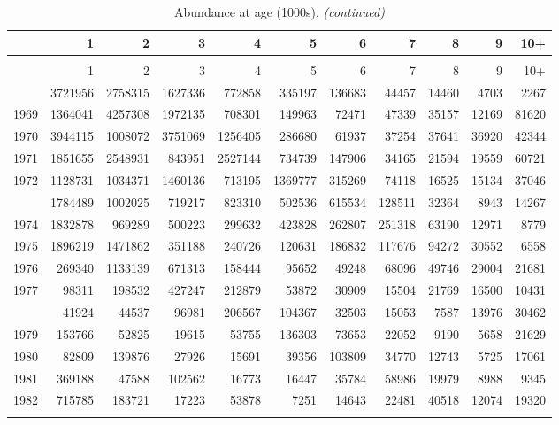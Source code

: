\documentclass[
]{article}
\begin{document}
\begin{longtable}[t]{lrrrrrrrrrr}
\caption{\label{tab:NAA-table}Abundance at age (1000s).}\\
\toprule
  & 1 & 2 & 3 & 4 & 5 & 6 & 7 & 8 & 9 & 10+\\
\midrule
\endfirsthead
\caption[]{Abundance at age (1000s). \textit{(continued)}}\\
\toprule
  & 1 & 2 & 3 & 4 & 5 & 6 & 7 & 8 & 9 & 10+\\
\midrule
\endhead

\endfoot
\bottomrule
\endlastfoot
1968 & 3721956 & 2758315 & 1627336 & 772858 & 335197 & 136683 & 44457 & 14460 & 4703 & 2267\\
1969 & 1364041 & 4257308 & 1972135 & 708301 & 149963 & 72471 & 47339 & 35157 & 12169 & 81620\\
1970 & 3944115 & 1008072 & 3751069 & 1256405 & 286680 & 61937 & 37254 & 37641 & 36920 & 42344\\
1971 & 1851655 & 2548931 & 843951 & 2527144 & 734739 & 147906 & 34165 & 21594 & 19559 & 60721\\
1972 & 1128731 & 1034371 & 1460136 & 713195 & 1369777 & 315269 & 74118 & 16525 & 15134 & 37046\\
\addlinespace
1973 & 1784489 & 1002025 & 719217 & 823310 & 502536 & 615534 & 128511 & 32364 & 8943 & 14267\\
1974 & 1832878 & 969289 & 500223 & 299632 & 423828 & 262807 & 251318 & 63190 & 12971 & 8779\\
1975 & 1896219 & 1471862 & 351188 & 240726 & 120631 & 186832 & 117676 & 94272 & 30552 & 6558\\
1976 & 269340 & 1133139 & 671313 & 158444 & 95652 & 49248 & 68096 & 49746 & 29004 & 21681\\
1977 & 98311 & 198532 & 427247 & 212879 & 53872 & 30909 & 15504 & 21769 & 16500 & 10431\\
\addlinespace
1978 & 41924 & 44537 & 96981 & 206567 & 104367 & 32503 & 15053 & 7587 & 13976 & 30462\\
1979 & 153766 & 52825 & 19615 & 53755 & 136303 & 73653 & 22052 & 9190 & 5658 & 21629\\
1980 & 82809 & 139876 & 27926 & 15691 & 39356 & 103809 & 34770 & 12743 & 5725 & 17061\\
1981 & 369188 & 47588 & 102562 & 16773 & 16447 & 35784 & 58986 & 19979 & 8988 & 9345\\
1982 & 715785 & 183721 & 17223 & 53878 & 7251 & 14643 & 22481 & 40518 & 12074 & 19320\\
\addlinespace

\end{longtable}
\end{document}
